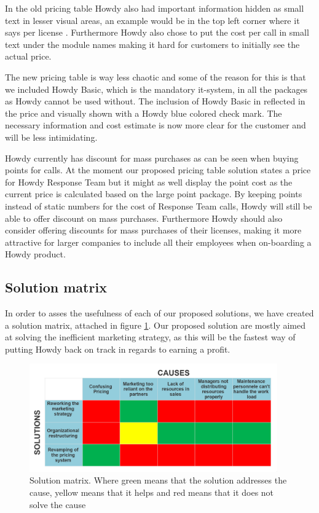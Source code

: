 \noindent In the old pricing table Howdy also had important information hidden as small text in lesser visual areas, an example would be in the top left corner where it says per license \cite[p.30]{oneofthepresentations}. Furthermore Howdy also chose to put the cost per call in small text under the module names making it hard for customers to initially see the actual price. 

\noindent The new pricing table is way less chaotic and some of the reason for this is that we included Howdy Basic, which is the mandatory it-system, in all the packages as Howdy cannot be used without. The inclusion of Howdy Basic in reflected in the price and visually shown with a Howdy blue colored check mark. The necessary information and cost estimate is now more clear for the customer and will be less intimidating.


\noindent Howdy currently has discount for mass purchases as can be seen when buying points for calls. At the moment our proposed pricing table solution states a price for Howdy Response Team but it might as well display the point cost as the current price is calculated based on the large point package. By keeping points instead of static numbers for the cost of Response Team calls, Howdy will still be able to offer discount on mass purchases. Furthermore Howdy should also consider offering discounts for mass purchases of their licenses, making it more attractive for larger companies to include all their employees when on-boarding a Howdy product. 

\subsection{Solution matrix}

In order to asses the usefulness of each of our proposed solutions, we have created a solution matrix, attached in figure \ref{fig:solution}. Our proposed solution are mostly aimed at solving the inefficient marketing strategy, as this will be the fastest way of putting Howdy back on track in regards to earning a profit.

\begin{figure}[H]
\centering
\includegraphics[width=0.95\textwidth]{figures/solutionmatrix .png}
\caption{Solution matrix. Where green means that the solution addresses the cause, yellow means that it helps and red means that it does not solve the cause}
\label{fig:solution}
\end{figure}
